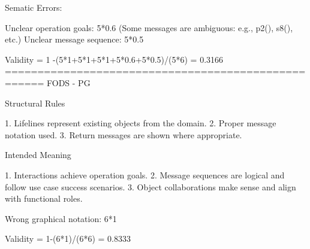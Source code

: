 Sematic Errors:

Unclear operation goals: 5*0.6 (Some messages are ambiguous: e.g., p2(), s8(), etc.)
Unclear message sequence: 5*0.5

Validity = 1 -(5*1+5*1+5*1+5*0.6+5*0.5)/(5*6) = 0.3166
====================================================
FODS - PG

Structural Rules

1. Lifelines represent existing objects from the domain.
2. Proper message notation used.
3. Return messages are shown where appropriate.

Intended Meaning

1. Interactions achieve operation goals.
2. Message sequences are logical and follow use case success scenarios.
3. Object collaborations make sense and align with functional roles.

Wrong graphical notation: 6*1

Validity = 1-(6*1)/(6*6) = 0.8333